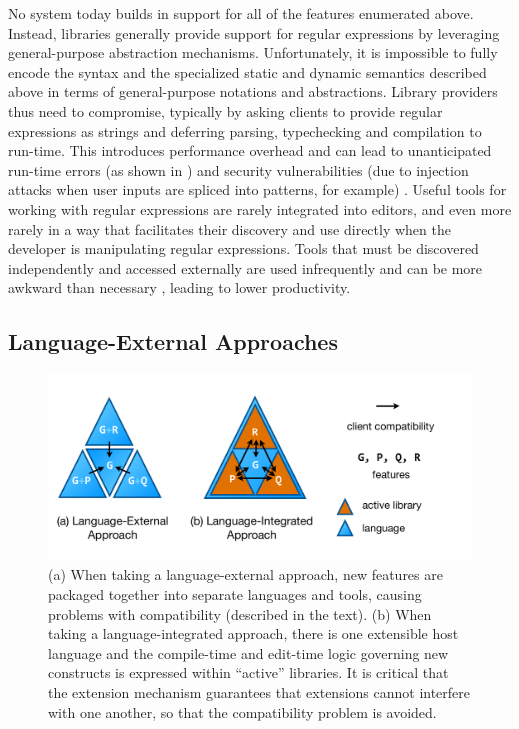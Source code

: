 No system today builds in support for all of the features enumerated above. Instead, libraries generally provide support for regular expressions by leveraging  general-purpose abstraction mechanisms. Unfortunately, it is impossible to fully encode the syntax and the specialized static and dynamic semantics described above in terms of general-purpose notations and abstractions. Library providers thus need to compromise, typically by asking clients to provide regular expressions as strings and deferring parsing, typechecking and compilation to run-time. This introduces performance overhead and can lead to unanticipated run-time errors (as shown in \cite{spishak2012type}) and security vulnerabilities (due to injection attacks when user inputs are spliced into patterns, for example) \cite{Bravenboer:2007:PIA:1289971.1289975}. Useful tools for working with regular expressions are rarely integrated into editors, and even more rarely in a way that facilitates their discovery and use directly when the developer is manipulating regular expressions. Tools that must be discovered independently and accessed externally are used infrequently \cite{Murphy-Hill:2011:PIE:1958824.1958888} and can be more awkward than necessary \cite{Campbell:2008:DRT:1636642.1636651, Omar:2012:ACC:2337223.2337324}, leading to lower productivity.

\subsection{Language-External Approaches}\label{external-approaches}
\begin{figure}
\begin{center}
\includegraphics[scale=.48]{approaches.pdf}
\end{center}
\vspace{-20px}
\caption{\small (a) When taking a language-external approach, new features are packaged together into separate languages and tools, causing problems with compatibility (described in the text). (b) When taking a language-integrated approach, there is one extensible host language and the compile-time and edit-time logic governing new constructs is expressed within ``active'' libraries. It is critical that the extension mechanism  guarantees that extensions cannot interfere with one another, so that the compatibility problem is avoided.}
\label{approaches}
\end{figure}

